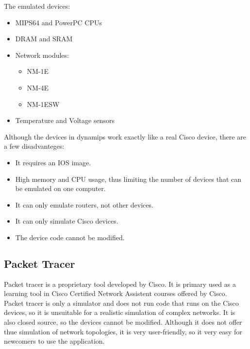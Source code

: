 The emulated devices:
\begin{itemize}
  \item MIPS64 and PowerPC CPUs
  \item DRAM and SRAM
  \item Network modules:
    \begin{itemize}
      \item NM-1E
      \item NM-4E
      \item NM-1ESW
    \end{itemize}
  \item Temperature and Voltage sensors
\end{itemize}

Although the devices in dynamips work exactly like a real Cisco device, there are a few disadvanteges:
\begin{itemize}
  \item It requires an IOS image.
  \item High memory and CPU usage, thus limiting the number of devices that can be emulated on one computer.
  \item It can only emulate routers, not other devices.
  \item It can only simulate Cisco devices.
  \item The device code cannot be modified.
\end{itemize}

\subsection{Packet Tracer}

Packet tracer is a proprietary tool developed by Cisco. It is primary used as a learning tool
in Cisco Certified Network Assistent courses offered by Cisco.
Packet tracer is only a simulator and does not run code that runs on the Cisco devices, so
it is unsuitable for a realistic simulation of complex networks. It is also closed source, so
the devices cannot be modified. Although it does not offer thue simulation of network topologies,
it is very user-friendly, so it very easy for newcomers to use the application.

